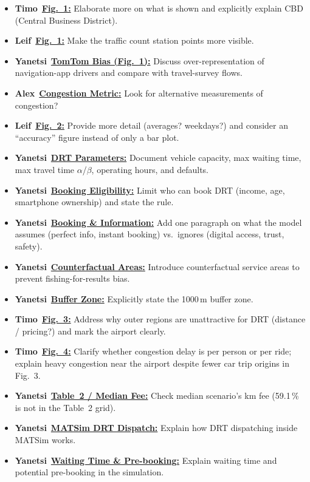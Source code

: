 \documentclass[preprint,12pt,authoryear]{elsarticle}
\newcommand{\todobadge}[2]{\colorbox{#1}{\textbf{\scriptsize #2}}}
\newcommand{\badgeTimo}{\todobadge{orange!30}{Timo}}
\newcommand{\badgeLeif}{\todobadge{yellow!40}{Leif}}
\newcommand{\badgeAlex}{\todobadge{blue!25}{Alex}}
\newcommand{\badgeYanetsi}{\todobadge{purple!30}{Yanetsi}}
\begin{document}
\begin{itemize}
  \item[$\square$] \badgeTimo\ \hyperlink{todo:fig1-timo}{\textbf{Fig.~1:}} Elaborate more on what is shown and explicitly explain CBD (Central Business District).
  \item[$\square$] \badgeLeif\ \hyperlink{todo:fig1-leif}{\textbf{Fig.~1:}} Make the traffic count station points more visible.
  \item[$\square$] \badgeYanetsi\ \hyperlink{todo:method-yanetsi-tomtom}{\textbf{TomTom Bias (Fig.~1):}} Discuss over-representation of navigation-app drivers and compare with travel-survey flows.
  \item[$\square$] \badgeAlex\ \hyperlink{todo:method-alt-cong}{\textbf{Congestion Metric:}} Look for alternative measurements of congestion?
  \item[$\square$] \badgeLeif\ \hyperlink{todo:fig2-leif}{\textbf{Fig.~2:}} Provide more detail (averages? weekdays?) and consider an ``accuracy'' figure instead of only a bar plot.
  \item[$\square$] \badgeYanetsi\ \hyperlink{todo:method-yanetsi-drt-params}{\textbf{DRT Parameters:}} Document vehicle capacity, max waiting time, max travel time $\alpha$/$\beta$, operating hours, and defaults.
  \item[$\square$] \badgeYanetsi\ \hyperlink{todo:method-yanetsi-eligibility}{\textbf{Booking Eligibility:}} Limit who can book DRT (income, age, smartphone ownership) and state the rule.
  \item[$\square$] \badgeYanetsi\ \hyperlink{todo:method-yanetsi-booking}{\textbf{Booking \& Information:}} Add one paragraph on what the model assumes (perfect info, instant booking) vs.\ ignores (digital access, trust, safety).
  \item[$\square$] \badgeYanetsi\ \hyperlink{todo:method-yanetsi-counterfactual}{\textbf{Counterfactual Areas:}} Introduce counterfactual service areas to prevent fishing-for-results bias.
  \item[$\square$] \badgeYanetsi\ \hyperlink{todo:method-yanetsi-buffer}{\textbf{Buffer Zone:}} Explicitly state the 1000\,m buffer zone.
  \item[$\square$] \badgeTimo\ \hyperlink{todo:fig3-timo}{\textbf{Fig.~3:}} Address why outer regions are unattractive for DRT (distance / pricing?) and mark the airport clearly.
  \item[$\square$] \badgeTimo\ \hyperlink{todo:fig4-timo}{\textbf{Fig.~4:}} Clarify whether congestion delay is per person or per ride; explain heavy congestion near the airport despite fewer car trip origins in Fig.~3.
  \item[$\square$] \badgeYanetsi\ \hyperlink{todo:method-yanetsi-median-fee}{\textbf{Table~2 / Median Fee:}} Check median scenario's km fee (59.1\,\% is not in the Table~2 grid).
  \item[$\square$] \badgeYanetsi\ \hyperlink{todo:method-yanetsi-dispatch}{\textbf{MATSim DRT Dispatch:}} Explain how DRT dispatching inside MATSim works.
  \item[$\square$] \badgeYanetsi\ \hyperlink{todo:method-yanetsi-wait}{\textbf{Waiting Time \& Pre-booking:}} Explain waiting time and potential pre-booking in the simulation.
\end{itemize}
\end{document}
